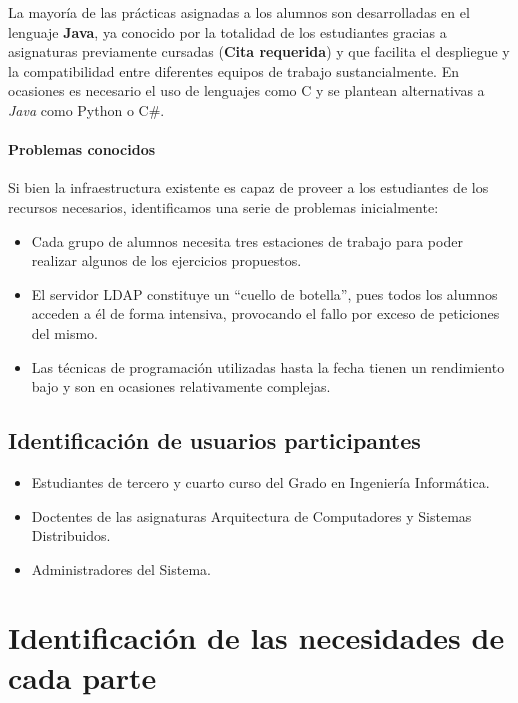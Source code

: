 La mayoría de las prácticas asignadas a los alumnos son desarrolladas en el lenguaje \textbf{Java}, ya conocido por la totalidad de los estudiantes gracias a asignaturas previamente cursadas (\textbf{Cita requerida}) y que facilita el despliegue y la compatibilidad entre diferentes equipos de trabajo sustancialmente. En ocasiones es necesario el uso de lenguajes como C y se plantean alternativas a \textit{Java} como Python o C\#.

\paragraph{Problemas conocidos}

Si bien la infraestructura existente es capaz de proveer a los estudiantes de los recursos necesarios, identificamos una serie de problemas inicialmente:

\begin{itemize}
  \item Cada grupo de alumnos necesita tres estaciones de trabajo para poder realizar algunos de los ejercicios propuestos.
  \item El servidor LDAP constituye un ``cuello de botella'', pues todos los alumnos acceden a él de forma intensiva, provocando el fallo por exceso de peticiones del mismo.
  \item Las técnicas de programación utilizadas hasta la fecha tienen un rendimiento bajo y son en ocasiones relativamente complejas.
\end{itemize}

\subsection{Identificación de usuarios participantes}

\begin{itemize}

  \item Estudiantes de tercero y cuarto curso del Grado en Ingeniería Informática.
  \item Doctentes de las asignaturas Arquitectura de Computadores y Sistemas Distribuidos.
  \item Administradores del Sistema.
\end{itemize}

\section{Identificación de las necesidades de cada parte}
